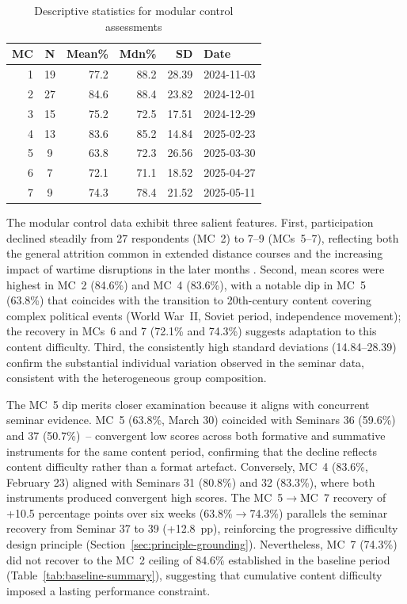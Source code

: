 \begin{table}[!h]
\centering
\caption{Descriptive statistics for modular control assessments}
\label{tab:mc-stats}
\small
\begin{tabular}{rcrrrl}
\hline
\textbf{MC} & \textbf{N} & \textbf{Mean\%} & \textbf{Mdn\%} & \textbf{SD} & \textbf{Date} \\
\hline
1 & 19 & 77.2 & 88.2 & 28.39 & 2024-11-03 \\
2 & 27 & 84.6 & 88.4 & 23.82 & 2024-12-01 \\
3 & 15 & 75.2 & 72.5 & 17.51 & 2024-12-29 \\
4 & 13 & 83.6 & 85.2 & 14.84 & 2025-02-23 \\
5 & 9  & 63.8 & 72.3 & 26.56 & 2025-03-30 \\
6 & 7  & 72.1 & 71.1 & 18.52 & 2025-04-27 \\
7 & 9  & 74.3 & 78.4 & 21.52 & 2025-05-11 \\
\hline
\end{tabular}
\end{table}

The modular control data exhibit three salient features. First, participation declined steadily from 27 respondents (MC~2) to 7--9 (MCs~5--7), reflecting both the general attrition common in extended distance courses and the increasing impact of wartime disruptions in the later months \cite{UNESCO2023}. Second, mean scores were highest in MC~2 (84.6\%) and MC~4 (83.6\%), with a notable dip in MC~5 (63.8\%) that coincides with the transition to 20th-century content covering complex political events (World War~II, Soviet period, independence movement); the recovery in MCs~6 and 7 (72.1\% and 74.3\%) suggests adaptation to this content difficulty. Third, the consistently high standard deviations (14.84--28.39) confirm the substantial individual variation observed in the seminar data, consistent with the heterogeneous group composition.

The MC~5 dip merits closer examination because it aligns with concurrent seminar evidence. MC~5 (63.8\%, March 30) coincided with Seminars 36 (59.6\%) and 37 (50.7\%)~-- convergent low scores across both formative and summative instruments for the same content period, confirming that the decline reflects content difficulty rather than a format artefact. Conversely, MC~4 (83.6\%, February 23) aligned with Seminars 31 (80.8\%) and 32 (83.3\%), where both instruments produced convergent high scores. The MC~5$\rightarrow$MC~7 recovery of +10.5 percentage points over six weeks (63.8\%$\rightarrow$74.3\%) parallels the seminar recovery from Seminar 37 to 39 (+12.8~pp), reinforcing the progressive difficulty design principle (Section~\ref{sec:principle-grounding}). Nevertheless, MC~7 (74.3\%) did not recover to the MC~2 ceiling of 84.6\% established in the baseline period (Table~\ref{tab:baseline-summary}), suggesting that cumulative content difficulty imposed a lasting performance constraint.

